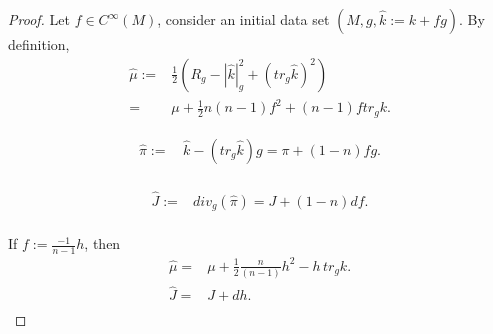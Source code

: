 \documentclass[10pt,a4paper]{amsart}
\newtheorem{comment}{Comment}
\def\Na{\nabla}
\def\h {\hat}
\def\la{\langle}
\def\lf{\left}
\def\ra{\rangle}
\def\ri{\right}
\begin{document}
\begin{proof}
Let $f\in C^\infty(M)$, consider an initial data set $(M,g,\hat k:=k+fg)$. 
By definition, 
\begin{equation}
\begin{split}
\hat \mu :=& \frac{1}{2}\lf( R_g-|\h k|_g^2+(tr_g \hat k)^2 \ri)\\
=&\mu+\frac{1}{2}n(n-1)f^2+(n-1)ftr_gk.  
\end{split}
\end{equation}

\begin{equation}
\begin{split}
\hat \pi:=&\, \h k-(tr_g \h k)g=\pi+(1-n)fg.\\
\end{split}
\end{equation}

\begin{equation}
\begin{split}
\hat J:=& div_{g}(\hat \pi)= J + (1-n) df. \\
\end{split}
\end{equation}



If $f:=\frac{-1}{n-1}h$, then 
\begin{equation}
\begin{split}
\hat \mu 
=&\mu+\frac{1}{2}\frac{n}{(n-1)}h^2-h\, tr_gk.  \\
\hat J= & J+dh. \\
\end{split} 
\end{equation}

\end{proof}
\end{document}
